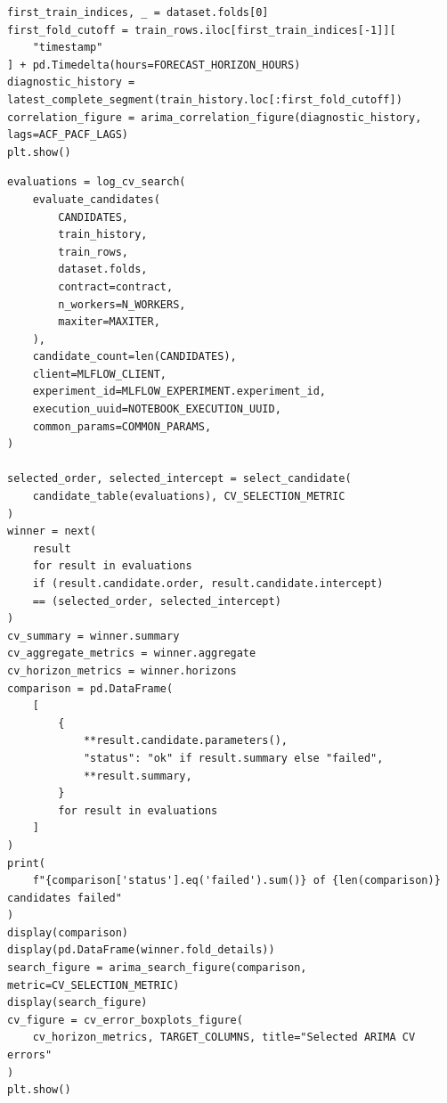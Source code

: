 \begin{verbatim}
first_train_indices, _ = dataset.folds[0]
first_fold_cutoff = train_rows.iloc[first_train_indices[-1]][
    "timestamp"
] + pd.Timedelta(hours=FORECAST_HORIZON_HOURS)
diagnostic_history = latest_complete_segment(train_history.loc[:first_fold_cutoff])
correlation_figure = arima_correlation_figure(diagnostic_history, lags=ACF_PACF_LAGS)
plt.show()
\end{verbatim}

\begin{verbatim}
evaluations = log_cv_search(
    evaluate_candidates(
        CANDIDATES,
        train_history,
        train_rows,
        dataset.folds,
        contract=contract,
        n_workers=N_WORKERS,
        maxiter=MAXITER,
    ),
    candidate_count=len(CANDIDATES),
    client=MLFLOW_CLIENT,
    experiment_id=MLFLOW_EXPERIMENT.experiment_id,
    execution_uuid=NOTEBOOK_EXECUTION_UUID,
    common_params=COMMON_PARAMS,
)

selected_order, selected_intercept = select_candidate(
    candidate_table(evaluations), CV_SELECTION_METRIC
)
winner = next(
    result
    for result in evaluations
    if (result.candidate.order, result.candidate.intercept)
    == (selected_order, selected_intercept)
)
cv_summary = winner.summary
cv_aggregate_metrics = winner.aggregate
cv_horizon_metrics = winner.horizons
comparison = pd.DataFrame(
    [
        {
            **result.candidate.parameters(),
            "status": "ok" if result.summary else "failed",
            **result.summary,
        }
        for result in evaluations
    ]
)
print(
    f"{comparison['status'].eq('failed').sum()} of {len(comparison)} candidates failed"
)
display(comparison)
display(pd.DataFrame(winner.fold_details))
search_figure = arima_search_figure(comparison, metric=CV_SELECTION_METRIC)
display(search_figure)
cv_figure = cv_error_boxplots_figure(
    cv_horizon_metrics, TARGET_COLUMNS, title="Selected ARIMA CV errors"
)
plt.show()
\end{verbatim}

